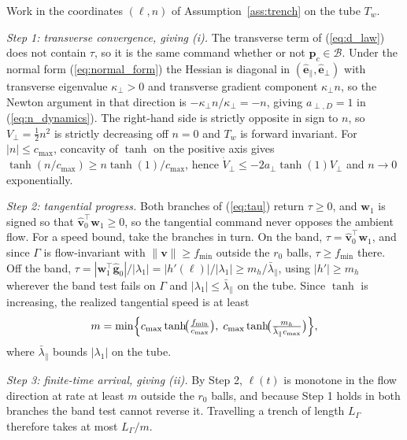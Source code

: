 \documentclass[lettersize,journal]{IEEEtran}
\begin{document}
\begin{IEEEproof}
Work in the coordinates $(\ell, n)$ of Assumption~\ref{ass:trench} on the
tube $T_w$.

\textit{Step 1: transverse convergence, giving (i).} The transverse term
of (\ref{eq:d_law}) does not contain $\tau$, so it is the same command
whether or not $\mathbf{p}_c \in \mathcal{B}$. Under the normal form
(\ref{eq:normal_form}) the Hessian is diagonal in
$(\hat{\mathbf{e}}_\parallel, \hat{\mathbf{e}}_\perp)$ with transverse
eigenvalue $\kappa_\perp > 0$ and transverse gradient component
$\kappa_\perp n$, so the Newton argument in that direction is
$-\kappa_\perp n/\kappa_\perp = -n$, giving $a_{\perp,D} = 1$ in
(\ref{eq:n_dynamics}). The right-hand side is strictly opposite in sign
to $n$, so $V_\perp = \tfrac{1}{2}n^2$ is strictly decreasing off $n = 0$
and $T_w$ is forward invariant. For $|n| \leq c_{\max}$, concavity of
$\tanh$ on the positive axis gives $\tanh(n/c_{\max}) \geq
n\tanh(1)/c_{\max}$, hence $\dot{V}_\perp \leq -2a_\perp\tanh(1)V_\perp$ and
$n \to 0$ exponentially.

\textit{Step 2: tangential progress.} Both branches of (\ref{eq:tau})
return $\tau \geq 0$, and $\mathbf{w}_1$ is signed so that
$\hat{\mathbf{v}}_0^\top\mathbf{w}_1 \geq 0$, so the tangential command
never opposes the ambient flow. For a speed bound, take the branches in
turn. On the band, $\tau = \hat{\mathbf{v}}_0^\top\mathbf{w}_1$, and
since $\Gamma$ is flow-invariant with $\|\mathbf{v}\| \geq f_{\min}$
outside the $r_0$ balls, $\tau \geq f_{\min}$ there. Off the band, $\tau
= |\mathbf{w}_1^\top\hat{\mathbf{g}}_0|/|\lambda_1| =
|h'(\ell)|/|\lambda_1| \geq m_h/\bar{\lambda}_\parallel$, using $|h'|
\geq m_h$ wherever the band test fails on $\Gamma$ and $|\lambda_1| \leq
\bar{\lambda}_\parallel$ on the tube. Since $\tanh$ is increasing, the
realized tangential speed is at least
\begin{equation}
    m = \min\Bigl\{
    c_{\max}\tanh\!\bigl(\tfrac{f_{\min}}{c_{\max}}\bigr),\;
    c_{\max}\tanh\!\bigl(\tfrac{m_h}
    {\bar{\lambda}_\parallel c_{\max}}\bigr)
    \Bigr\},
    \label{eq:progress_rate}
\end{equation}
where $\bar{\lambda}_\parallel$ bounds $|\lambda_1|$ on the tube.

\textit{Step 3: finite-time arrival, giving (ii).} By Step 2, $\ell(t)$
is monotone in the flow direction at rate at least $m$ outside the $r_0$
balls, and because Step 1 holds in both branches the band test cannot
reverse it. Travelling a trench of length $L_\Gamma$ therefore takes at
most $L_\Gamma/m$.
\end{IEEEproof}
\end{document}
